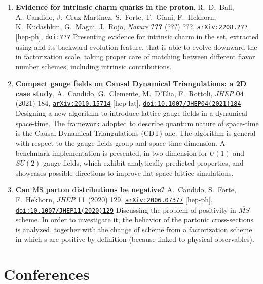 \documentclass[10pt, a4paper, sans]{moderncv}
\newcommand{\journal}[4]{\textit{#1} \textbf{#2} (#3) #4}
\newcommand{\doi}[1]{\texttt{\href{https://doi.org/#1}{doi:#1}}}
\newcommand{\arxiv}[2]{\texttt{\href{https://arxiv.org/abs/#1}{arXiv:#1}} [#2]}
\begin{document}
\begin{multicols}{2}
\begin{enumerate}
    \item \textbf{Evidence for intrinsic charm quarks in the proton},
      R.~D.~Ball, A.~Candido, J.~Cruz-Martinez, S.~Forte, T.~Giani, F.~Hekhorn,
      K.~Kudashkin, G.~Magni, J.~Rojo, 
      \journal{Nature}{???}{???}{???},
      \arxiv{2208.???}{hep-ph},
      \doi{???}
      \newline
      Presenting evidence for intrinsic charm in the  \pdf set,
      extracted using \eko and its backward evolution feature, that is able to
      evolve downward the \pdf in factorization scale, taking proper care of
      matching between different flavor number schemes, including intrinsic
      contributions.
    \item \textbf{Compact gauge fields on Causal Dynamical Triangulations: a 2D
      case study},
      A.~Candido, G.~Clemente, M.~D'Elia, F.~Rottoli,
      \journal{JHEP}{04}{2021}{184},
      \arxiv{2010.15714}{hep-lat},
      \doi{10.1007/JHEP04(2021)184} 
      \newline
      Designing a new algorithm to introduce lattice gauge fields in a
      dynamical space-time. The framework adopted to describe quantum nature of
      space-time is the Causal Dynamical Triangulations ({\small CDT}) one.
      The algorithm is general with respect to the gauge fields group and
      space-time dimension.
      A benchmark implementation is presented, in two dimension for $U(1)$ and
      $SU(2)$ gauge fields, which exhibit analytically predicted properties,
      and showcases possible directions to improve flat space lattice simulations.
    \item \textbf{Can $ \overline{\mathrm{MS}} $ parton distributions be negative?}
      A.~Candido, S.~Forte, F.~Hekhorn,
      \journal{JHEP}{11}{2020}{129},
      \arxiv{2006.07377}{hep-ph},
      \doi{10.1007/JHEP11(2020)129}
      \newline
      Discussing the problem of \pdf positivity in $\overline{MS}$ scheme. In
      order to investigate it, the behavior of the partonic cross-sections is
      analyzed, together with the change of scheme from a factorization scheme
      in which \pdf{}s are positive by definition (because linked to physical
      observables).
\end{enumerate}

\columnbreak

\section{Conferences}


\end{multicols}
\end{document}

